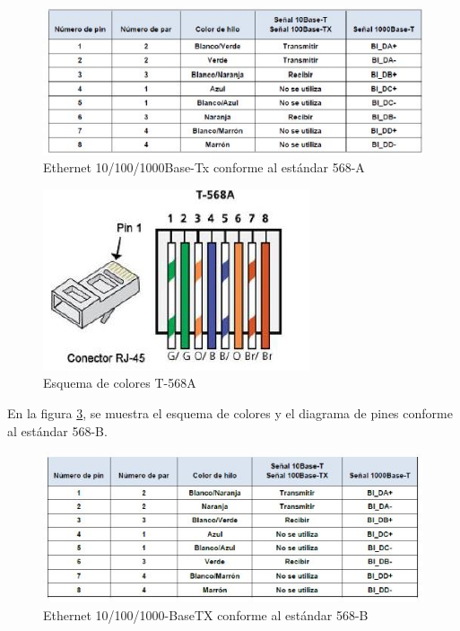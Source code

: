 \documentclass[journal]{IEEEtran}
\begin{document}
\begin{figure}[ht]
	\centering
	\includegraphics[scale=0.65]{1.JPG} 
	\caption{Ethernet 10/100/1000Base-Tx conforme al estándar 568-A}
	\label{pares}
\end{figure}

\begin{figure}[ht]
	\centering
	\includegraphics[scale=0.75]{2.JPG} 
	\caption{Esquema de colores T-568A}
	\label{568A}
\end{figure}


\newpage

En la figura \ref{568B}, se muestra el esquema de colores y el diagrama de pines conforme al estándar 568-B.
\begin{figure}[ht]
	\centering
	\includegraphics[scale=0.65]{4.JPG} 
	\caption{Ethernet 10/100/1000-BaseTX conforme al estándar 568-B}
	\label{568B}
\end{figure}
\end{document}
